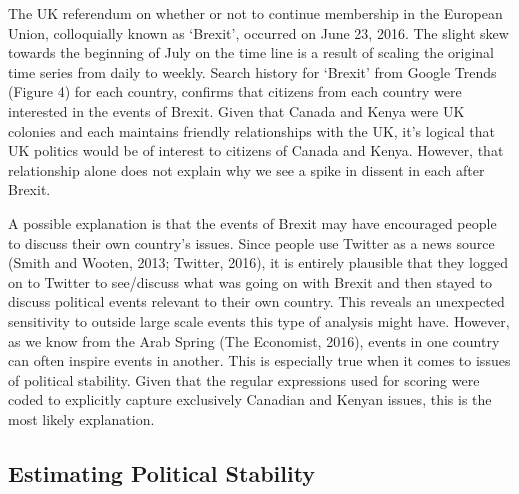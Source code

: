 \documentclass[12pt]{article}
\begin{document}
\begin{spacing}{1.5}
The UK referendum on whether or not to continue membership in the European Union, colloquially known as `Brexit', occurred on June 23, 2016. The slight skew towards the beginning of July on the time line is a result of scaling the original time series from daily to weekly. Search history for `Brexit' from Google Trends (Figure 4) for each country, confirms that citizens from each country were interested in the events of Brexit. Given that Canada and Kenya were UK colonies and each maintains friendly relationships with the UK, it's logical that UK politics would be of interest to citizens of Canada and Kenya. However, that relationship alone does not explain why we see a spike in dissent in each after Brexit. 

A possible explanation is that the events of Brexit may have encouraged people to discuss their own country's issues. Since people use Twitter as a news source (Smith and Wooten, 2013; Twitter, 2016), it is entirely plausible that they logged on to Twitter to see/discuss what was going on with Brexit and then stayed to discuss political events relevant to their own country. This reveals an unexpected sensitivity to outside large scale events this type of analysis might have. However, as we know from the Arab Spring (The Economist, 2016), events in one country can often inspire events in another. This is especially true when it comes to issues of political stability. Given that the regular expressions used for scoring were coded to explicitly capture exclusively Canadian and Kenyan issues, this is the most likely explanation.    







\subsection*{Estimating Political Stability}


\end{spacing}
\end{document}
